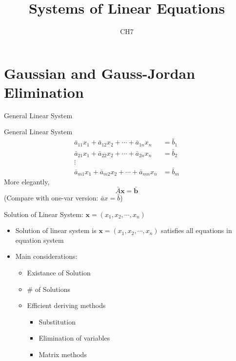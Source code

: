\documentclass[a4paper,11pt]{article}
\author[조남운]{\mail}
\title{Systems of Linear Equations}
\subtitle{CH7}
\begin{document}
	
\maketitle


\section{Gaussian and Gauss-Jordan Elimination} %
\label{sec:gaussian_and_gauss_jordan_elimination}
\begin{frame}[t]{General Linear System}
	\begin{block}
		{General Linear System}
		\begin{align*}
			\bar a_{11} x_1 + \bar a_{12}x_2 + \cdots + \bar a_{1n}x_n &= \bar b_1\\
			\bar a_{21} x_1 + \bar a_{22}x_2 + \cdots + \bar a_{2n}x_n &= \bar b_2\\
			\vdots\\
			\bar a_{m1} x_1 + \bar a_{m2}x_2 + \cdots + \bar a_{mn}x_n &= \bar b_m
		\end{align*}
		More elegantly, 
		\[
			\bar{A}\mathbf{x} = \bar{\mathbf{b}}
		\]
		(Compare with one-var version: $\bar a x = \bar b$)
	\end{block}
\end{frame}
\begin{frame}[t]{Solution of Linear System: $\mathbf{x}=(x_1,x_2,\cdots,x_n)$}
	\begin{itemize}
		\item Solution of linear system is $\mathbf{x}=(x_1,x_2,\cdots,x_n)$ satisfies all equations in equation system
		\item Main considerations:
		\begin{itemize}
			\item Existance of Solution
			\item \# of Solutions
			\item Efficient deriving methods
			\begin{itemize}
				\item Substitution
				\item Elimination of variables
				\item Matrix methods
			\end{itemize}
		\end{itemize}
	\end{itemize}
\end{frame}
\end{document}
